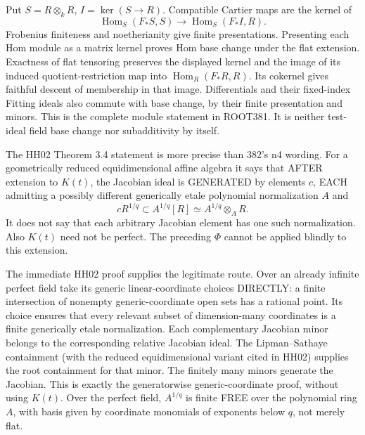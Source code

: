 \documentclass[11pt]{article}
\begin{document}
Put \(S=R\otimes_kR\), \(I=\ker(S\to R)\). Compatible Cartier maps are the kernel of
\[
\operatorname{Hom}_S(F_*S,S)\longrightarrow\operatorname{Hom}_S(F_*I,R).
\]
Frobenius finiteness and noetherianity give finite presentations. Presenting each Hom module as a matrix kernel proves Hom base change under the flat extension. Exactness of flat tensoring preserves the displayed kernel and the image of its induced quotient-restriction map into \(\operatorname{Hom}_R(F_*R,R)\). Its cokernel gives faithful descent of membership in that image. Differentials and their fixed-index Fitting ideals also commute with base change, by their finite presentation and minors. This is the complete module statement in ROOT381. It is neither test-ideal field base change nor subadditivity by itself.

The HH02 Theorem 3.4 statement is more precise than 382's n4 wording. For a geometrically reduced equidimensional affine algebra it says that AFTER extension to \(K(t)\), the Jacobian ideal is GENERATED by elements \(c\), EACH admitting a possibly different generically etale polynomial normalization \(A\) and
\[
cR^{1/q}\subset A^{1/q}[R]\simeq A^{1/q}\otimes_A R.
\]
It does not say that each arbitrary Jacobian element has one such normalization. Also \(K(t)\) need not be perfect. The preceding \(\Phi\) cannot be applied blindly to this extension.

The immediate HH02 proof supplies the legitimate route. Over an already infinite perfect field take its generic linear-coordinate choices DIRECTLY: a finite intersection of nonempty generic-coordinate open sets has a rational point. Its choice ensures that every relevant subset of dimension-many coordinates is a finite generically etale normalization. Each complementary Jacobian minor belongs to the corresponding relative Jacobian ideal. The Lipman--Sathaye containment (with the reduced equidimensional variant cited in HH02) supplies the root containment for that minor. The finitely many minors generate the Jacobian. This is exactly the generatorwise generic-coordinate proof, without using \(K(t)\). Over the perfect field, \(A^{1/q}\) is finite FREE over the polynomial ring \(A\), with basis given by coordinate monomials of exponents below \(q\), not merely flat.
\end{document}
